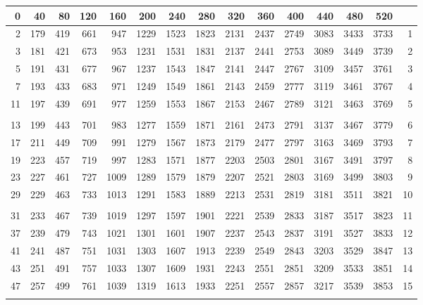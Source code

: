 \begin{tabular}{rrrrrrrrrrrrrr@{\;\;\vrule width \heavyrulewidth\;}r}
\toprule
0 & 40 & 80 & 120 & 160 & 200 & 240 & 280 & 320 & 360 & 400 & 440 & 480 & 520 &\\
\midrule[\heavyrulewidth]
   2 &  179 &  419 &  661 &  947 & 1229 & 1523 & 1823 & 2131 & 2437 & 2749 & 3083 & 3433 & 3733 &    1\\
   3 &  181 &  421 &  673 &  953 & 1231 & 1531 & 1831 & 2137 & 2441 & 2753 & 3089 & 3449 & 3739 &    2\\
   5 &  191 &  431 &  677 &  967 & 1237 & 1543 & 1847 & 2141 & 2447 & 2767 & 3109 & 3457 & 3761 &    3\\
   7 &  193 &  433 &  683 &  971 & 1249 & 1549 & 1861 & 2143 & 2459 & 2777 & 3119 & 3461 & 3767 &    4\\
  11 &  197 &  439 &  691 &  977 & 1259 & 1553 & 1867 & 2153 & 2467 & 2789 & 3121 & 3463 & 3769 &    5\\
&&&&&&&&&&&&&&\\
  13 &  199 &  443 &  701 &  983 & 1277 & 1559 & 1871 & 2161 & 2473 & 2791 & 3137 & 3467 & 3779 &    6\\
  17 &  211 &  449 &  709 &  991 & 1279 & 1567 & 1873 & 2179 & 2477 & 2797 & 3163 & 3469 & 3793 &    7\\
  19 &  223 &  457 &  719 &  997 & 1283 & 1571 & 1877 & 2203 & 2503 & 2801 & 3167 & 3491 & 3797 &    8\\
  23 &  227 &  461 &  727 & 1009 & 1289 & 1579 & 1879 & 2207 & 2521 & 2803 & 3169 & 3499 & 3803 &    9\\
  29 &  229 &  463 &  733 & 1013 & 1291 & 1583 & 1889 & 2213 & 2531 & 2819 & 3181 & 3511 & 3821 &   10\\
&&&&&&&&&&&&&&\\
  31 &  233 &  467 &  739 & 1019 & 1297 & 1597 & 1901 & 2221 & 2539 & 2833 & 3187 & 3517 & 3823 &   11\\
  37 &  239 &  479 &  743 & 1021 & 1301 & 1601 & 1907 & 2237 & 2543 & 2837 & 3191 & 3527 & 3833 &   12\\
  41 &  241 &  487 &  751 & 1031 & 1303 & 1607 & 1913 & 2239 & 2549 & 2843 & 3203 & 3529 & 3847 &   13\\
  43 &  251 &  491 &  757 & 1033 & 1307 & 1609 & 1931 & 2243 & 2551 & 2851 & 3209 & 3533 & 3851 &   14\\
  47 &  257 &  499 &  761 & 1039 & 1319 & 1613 & 1933 & 2251 & 2557 & 2857 & 3217 & 3539 & 3853 &   15\\
&&&&&&&&&&&&&&\\

\end{tabular}
